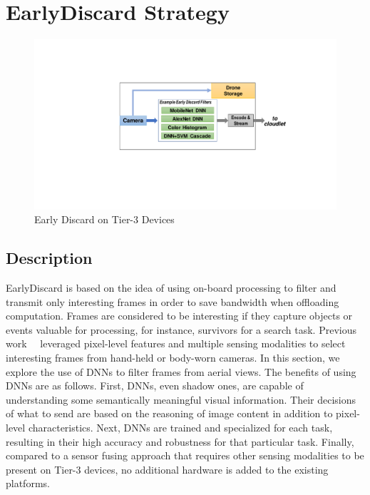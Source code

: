 
\section{{\xc EarlyDiscard} Strategy}
\label{sec:earlydiscard}

\begin{figure}
\includegraphics[trim={9cm 6.5cm 5cm 4.8cm},clip,width=\linewidth]{FIGS/fig-ondrone-early-discard.pdf}
\caption{Early Discard on Tier-3 Devices}
\label{fig:ondrone}
\end{figure}


\subsection{Description}
EarlyDiscard is based on the idea of using on-board processing to filter and
transmit only interesting frames in order to save bandwidth when offloading
computation. Frames are considered to be interesting if they capture objects or
events valuable for processing, for instance, survivors for a search task.
Previous work~\cite{Hu2015}~\cite{Naderiparizi2017} leveraged pixel-level
features and multiple sensing modalities to select interesting frames from
hand-held or body-worn cameras. In this section, we explore the use of DNNs to
filter frames from aerial views. The benefits of using DNNs are as follows.
First, DNNs, even shadow ones, are capable of understanding some semantically
meaningful visual information. Their decisions of what to send are based on the
reasoning of image content in addition to pixel-level characteristics. Next,
DNNs are trained and specialized for each task, resulting in their high accuracy
and robustness for that particular task. Finally, compared to a sensor fusing
approach that requires other sensing modalities to be present on Tier-3 devices,
no additional hardware is added to the existing platforms.

